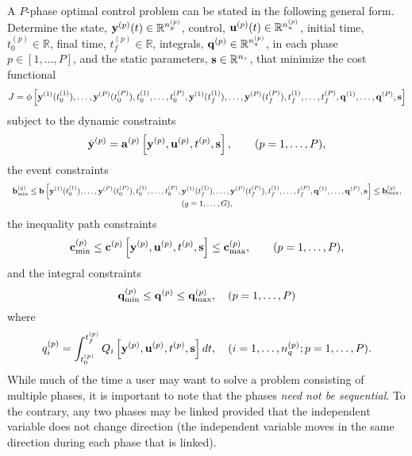 \documentclass[10pt]{article}
\begin{document}
A $P$-phase optimal control problem can be stated in the following
general form.  Determine the state, $\mathbf{y}^{(p)}(t)\in\mathbb{R}^{n_y^{(p)}}$, control,
$\mathbf{u}^{(p)}(t)\in\mathbb{R}^{n_u^{(p)}}$, initial time, $t_0^{(p)}\in\mathbb{R}$, final time, $t_f^{(p)}\in\mathbb{R}$,
integrals, $\mathbf{q}^{(p)}\in\mathbb{R}^{n_q^{(p)}}$, in each phase $p\in[1,\ldots,P]$, and the
static parameters, $\mathbf{s}\in\mathbb{R}^{n_s}$, that minimize the cost functional  
\begin{equation}
  J = \phi\left[\mathbf{y}^{(1)}(t_0^{(1)}),\ldots,\mathbf{y}^{(P)}(t_0^{(P)}),t_0^{(1)},\ldots,t_0^{(P)},\mathbf{y}^{(1)}(t_f^{(1)}),\ldots,\mathbf{y}^{(P)}(t_f^{(P)}),t_f^{(1)},\ldots,t_f^{(P)},\mathbf{q}^{(1)},\ldots,\mathbf{q}^{(P)},\mathbf{s}\right]
\end{equation}
subject to the dynamic constraints
\begin{equation}
  \dot{\mathbf{y}}^{(p)} = \mathbf{a}^{(p)}\left[\mathbf{y}^{(p)},\mathbf{u}^{(p)},t^{(p)},\mathbf{s}\right], \qquad (p=1,\ldots,P),
\end{equation}
the event constraints
\begin{equation}
  \small
  \begin{array}{c}
  \mathbf{b}_{\min}^{(g)} \leq
\mathbf{b}\left[\mathbf{y}^{(1)}(t_0^{(1)}),\ldots,\mathbf{y}^{(P)}(t_0^{(P)}),t_0^{(1)},\ldots,t_0^{(P)},\mathbf{y}^{(1)}(t_f^{(1)}),\ldots,\mathbf{y}^{(P)}(t_f^{(P)}),t_f^{(1)},\ldots,t_f^{(P)},\mathbf{q}^{(1)},\ldots,\mathbf{q}^{(P)},\mathbf{s}\right]
  \leq \mathbf{b}_{\max}^{(g)}, \\ (g=1,\ldots,G), \end{array}
\end{equation}
the inequality path constraints
\begin{equation}
  \mathbf{c}_{\min}^{(p)} \leq
  \mathbf{c}^{(p)}\left[\mathbf{y}^{(p)},\mathbf{u}^{(p)},t^{(p)},\mathbf{s}\right]\leq \mathbf{c}_{\max}^{(p)}, \qquad   (p=1,\ldots,P),
\end{equation}
and the integral constraints
\begin{equation}
  \mathbf{q}_{\min}^{(p)} \leq \mathbf{q}^{(p)} \leq \mathbf{q}_{\max}^{(p)}, \quad (p=1,\ldots,P)
\end{equation}
where
\begin{equation}
  q_i^{(p)} = \int_{t_0^{(p)}}^{t_f^{(p)}} Q_i\left[\mathbf{y}^{(p)},\mathbf{u}^{(p)},t^{(p)},\mathbf{s}\right]dt,\quad (i=1,\ldots,n_q^{(p)};p=1,\ldots,P).
\end{equation}
While much of the time a user may want to solve a problem consisting of
multiple phases, it is important to note that the phases {\em need not
  be sequential}.  To the contrary, any two phases may be linked 
provided that the independent variable does not change direction (\ie the
independent variable moves in the same direction during each phase that is
linked).  
\end{document}
